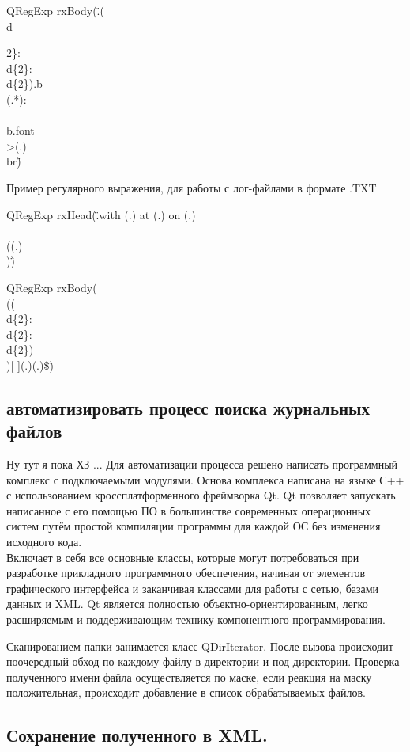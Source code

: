 QRegExp rxBody(\".\*(\\d{2\}:\\d\{2\}:\\d\{2\}).\*b\\\>(.*):\\\<\\\/b.\*font\\>(.\*)\\\<br\")


Пример регулярного выражения, для работы с лог-файлами в формате .TXT

QRegExp rxHead(\".\*with (.\*) at (.\*) on (.\*)\\\/ \\((.\*)\\)\")

QRegExp rxBody(\"\\((\\d\{2\}:\\d\{2\}:\\d\{2\})\\)[ ]\*(.\*)\:(.\*)\$\")

\subsection{автоматизировать процесс поиска журнальных файлов}
 Ну тут я пока ХЗ ... 
Для автоматизации процесса решено написать программный комплекс с подключаемыми модулями. Основа комплекса написана на языке С++ с использованием кроссплатформенного фреймворка Qt.
Qt позволяет запускать написанное с его помощью ПО в большинстве современных операционных систем путём простой компиляции программы для каждой ОС без изменения исходного кода.\\
Включает в себя все основные классы, которые могут потребоваться при разработке прикладного программного обеспечения, начиная от элементов графического интерфейса и заканчивая классами для работы с сетью, базами данных и XML. Qt является полностью объектно-ориентированным, легко расширяемым и поддерживающим технику компонентного программирования.

Сканированием папки занимается класс QDirIterator. После вызова происходит поочередный обход по каждому файлу в директории и под директории. Проверка полученного имени файла  осуществляется по маске, если реакция на маску положительная, происходит добавление в список обрабатываемых файлов. 


\subsection{Сохранение полученного в XML.}

}
